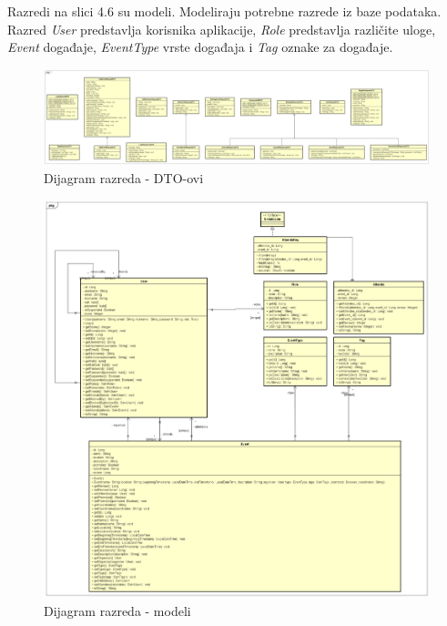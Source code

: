 			\indent Razredi na slici 4.6 su modeli. Modeliraju potrebne razrede iz baze podataka. Razred \textit{User} predstavlja korisnika aplikacije, \textit{Role} predstavlja različite uloge, \textit{Event} događaje, \textit{EventType} vrste događaja i \textit{Tag} oznake za događaje.
			\eject
			
			\begin{figure}[h]
				\includegraphics[width=\textwidth]{dijagrami/Razredni/DTO dijagram.png}
				\caption{Dijagram razreda - DTO-ovi}
			\end{figure}
		
		    \begin{figure}[H]
		    	\includegraphics[width=\textwidth]{dijagrami/Razredni/Dijagram modela.png}
		    	\caption{Dijagram razreda - modeli}
		    \end{figure}
			
